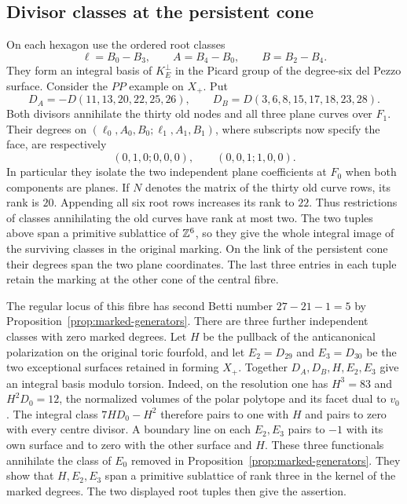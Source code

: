 \subsection{Divisor classes at the persistent cone}
On each hexagon use the ordered root classes
\[
 \ell=B_0-B_3,\qquad A=B_4-B_0,\qquad B=B_2-B_4 .
\]
They form an integral basis of $K_E^\perp$ in the Picard group of
the degree-six del Pezzo surface. Consider the $PP$ example on
$X_+$. Put
\[
 D_A=-D(11,13,20,22,25,26),\qquad
 D_B=D(3,6,8,15,17,18,23,28).
\]
Both divisors annihilate the thirty old nodes and all three plane
curves over $F_1$. Their degrees on
$(\ell_0,A_0,B_0;\ell_1,A_1,B_1)$, where subscripts now specify
the face, are respectively
\[
 (0,1,0;0,0,0),\qquad (0,0,1;1,0,0).
\]
In particular they isolate the two independent plane coefficients
at $F_0$ when both components are planes. If $N$ denotes the
matrix of the thirty old curve rows, its rank is $20$. Appending
all six root rows increases its rank to $22$. Thus restrictions
of classes annihilating the old curves have rank at most two.
The two tuples above span a primitive sublattice of $\mathbb Z^6$,
so they give the whole integral image of the surviving classes in
the original marking. On the link of the persistent cone their
degrees span the two plane coordinates. The last three entries in
each tuple retain the marking at the other cone of the central fibre.

The regular locus of this fibre has second Betti number
$27-21-1=5$ by Proposition~\ref{prop:marked-generators}. There are
three further independent classes with zero marked degrees.
Let $H$ be the pullback of the anticanonical polarization on the
original toric fourfold, and let $E_2=D_{29}$ and $E_3=D_{30}$ be the
two exceptional surfaces retained in forming $X_+$. Together
$D_A,D_B,H,E_2,E_3$ give an integral basis modulo torsion. Indeed,
on the resolution one has $H^3=83$ and $H^2D_0=12$, the normalized
volumes of the polar polytope and its facet dual to $v_0$.
The integral class $7HD_0-H^2$ therefore pairs to one with $H$
and pairs to zero with every centre divisor. A boundary line on
each $E_2,E_3$ pairs to $-1$ with its own surface and to zero with
the other surface and $H$. These three functionals annihilate the
class of $E_0$ removed in Proposition~\ref{prop:marked-generators}.
They show that $H,E_2,E_3$ span a primitive sublattice of rank
three in the kernel of the marked degrees. The two displayed root
tuples then give the assertion.
